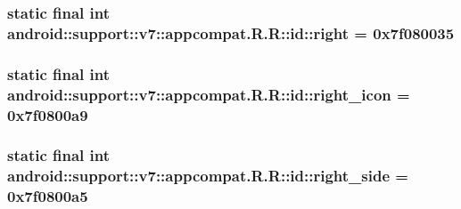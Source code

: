 \hypertarget{classandroid_1_1support_1_1v7_1_1appcompat_1_1_r_1_1id_962917c5f791ff33a342365acbe1f9f0}{
\subsubsection[{right}]{\setlength{\rightskip}{0pt plus 5cm}static final int android::support::v7::appcompat.R.R::id::right = 0x7f080035}}
\label{classandroid_1_1support_1_1v7_1_1appcompat_1_1_r_1_1id_962917c5f791ff33a342365acbe1f9f0}


\hypertarget{classandroid_1_1support_1_1v7_1_1appcompat_1_1_r_1_1id_c4b2f4c310d9eadb3d4463b2d607e720}{
\subsubsection[{right\_\-icon}]{\setlength{\rightskip}{0pt plus 5cm}static final int android::support::v7::appcompat.R.R::id::right\_\-icon = 0x7f0800a9}}
\label{classandroid_1_1support_1_1v7_1_1appcompat_1_1_r_1_1id_c4b2f4c310d9eadb3d4463b2d607e720}


\hypertarget{classandroid_1_1support_1_1v7_1_1appcompat_1_1_r_1_1id_aed558b6dc9fed0542465c08552c52e2}{
\subsubsection[{right\_\-side}]{\setlength{\rightskip}{0pt plus 5cm}static final int android::support::v7::appcompat.R.R::id::right\_\-side = 0x7f0800a5}}
\label{classandroid_1_1support_1_1v7_1_1appcompat_1_1_r_1_1id_aed558b6dc9fed0542465c08552c52e2}


